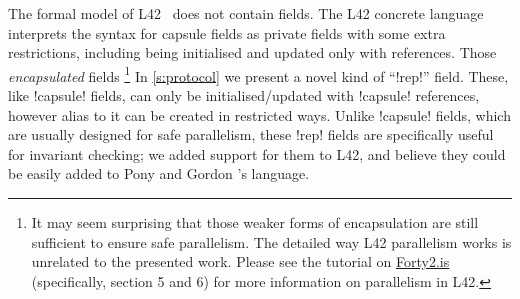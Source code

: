The formal model of L42~\cite{GIANNINI2019145} does not
contain \Q@capsule@ fields.
The L42 concrete language interprets the syntax for capsule fields as private \Q@mut@ fields with some extra restrictions, including being initialised and updated only with \Q@capsule@ references.
Those \emph{encapsulated} fields  %
\footnote{It may seem surprising that 
those weaker forms of encapsulation are still sufficient to ensure safe  parallelism.
The detailed way L42 parallelism works is unrelated to the presented work.
Please see the tutorial on \url{Forty2.is} (specifically, section 5 and 6) for more information on parallelism in L42.
}
In \autoref{s:protocol} we present a novel kind of ``\Q!rep!'' field.
These, like \Q!capsule! fields, can only be initialised/updated with \Q!capsule! references,
however alias to it can be created in restricted ways.
Unlike \Q!capsule! fields, which are usually designed for safe parallelism,
these \Q!rep! fields are specifically useful for invariant checking;
 we added support for them to L42, and believe they could be easily added to Pony and Gordon \etal's language.


